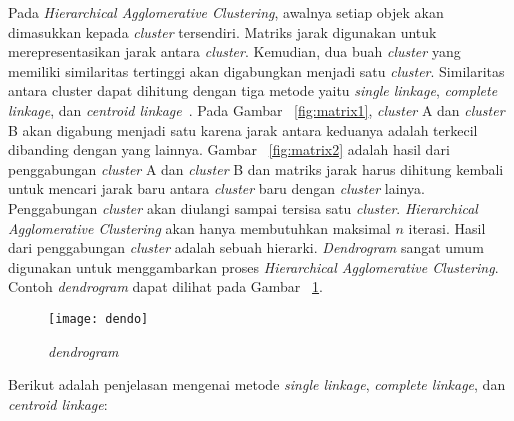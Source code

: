 Pada \textit{Hierarchical Agglomerative Clustering}, awalnya setiap objek akan dimasukkan kepada \textit{cluster} tersendiri. Matriks jarak digunakan untuk merepresentasikan jarak antara \textit{cluster}. Kemudian, dua buah \textit{cluster} yang memiliki similaritas tertinggi akan digabungkan menjadi satu \textit{cluster}. Similaritas antara cluster dapat dihitung dengan tiga metode yaitu \textit{single linkage}, \textit{complete linkage}, dan \textit{centroid linkage}~\cite{anil:03:afcd}. Pada Gambar ~\ref{fig:matrix1}, \textit{cluster} A dan  \textit{cluster} B akan digabung menjadi satu karena jarak antara keduanya adalah terkecil dibanding dengan yang lainnya. Gambar ~\ref{fig:matrix2} adalah hasil dari penggabungan \textit{cluster} A dan \textit{cluster} B dan matriks jarak harus dihitung kembali untuk mencari jarak baru antara \textit{cluster} baru dengan \textit{cluster} lainya. Penggabungan \textit{cluster} akan diulangi sampai tersisa satu \textit{cluster}. \textit{Hierarchical Agglomerative Clustering} akan hanya membutuhkan maksimal $n$ iterasi. Hasil dari penggabungan \textit{cluster} adalah sebuah hierarki. \textit{Dendrogram} sangat umum digunakan untuk menggambarkan proses \textit{Hierarchical Agglomerative Clustering}. Contoh \textit{dendrogram} dapat dilihat pada Gambar ~\ref{fig:dendo}.\\


\begin{figure}[H]
    \centering  
    \texttt{[image: dendo]}  
    \caption[{\it dendrogram} ]{{\it dendrogram}} 
    \label{fig:dendo} 
\end{figure}


Berikut adalah penjelasan mengenai metode \textit{single linkage}, \textit{complete linkage}, dan \textit{centroid linkage}:

